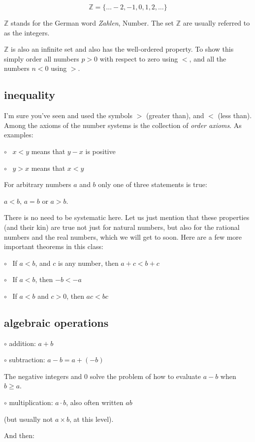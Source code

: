 \documentclass[11pt, oneside]{article}
\begin{document}
\[ \mathbb{Z} = \{ \dots -2, -1, 0, 1, 2, \dots \} \]

$\mathbb{Z}$ stands for the German word \emph{Zahlen}, Number.  The set $\mathbb{Z}$ are usually referred to as the integers.

$\mathbb{Z}$ is also an infinite set and also has the well-ordered property.  To show this simply order all numbers $p > 0$ with respect to zero using $<$, and all the numbers $n < 0$ using $>$.

\subsection*{inequality}
I'm sure you've seen and used the symbols $>$ (greater than), and $<$ (less than).  Among the axioms of the number systems is the collection of \emph{order axioms}.  As examples:

$\circ$ \ $x < y$ means that $y - x$ is positive

$\circ$ \ $y > x$ means that $x < y$

For arbitrary numbers $a$ and $b$ only one of three statements is true:  

$a < b$, $a = b$ or $a > b$.

There is no need to be systematic here.  Let us just mention that these properties (and their kin) are true not just for natural numbers, but also for the rational numbers and the real numbers, which we will get to soon.  Here are a few more important theorems in this class:

$\circ$ \ If $a < b$, and $c$ is any number, then $a + c < b + c$

$\circ$ \ If $a < b$, then $-b < -a$

$\circ$ \ If $a < b$ and $c > 0$, then $ac < bc$

\subsection*{algebraic operations}

$\circ$ addition:  $a + b$

$\circ$ subtraction:  $a - b = a + (-b)$

The negative integers and $0$ solve the problem of how to evaluate $a - b$ when $b \ge a$.

$\circ$ multiplication:  $a \cdot b$, also often written $ab$ 

(but usually not $a \times b$, at this level).

And then:
\end{document}
